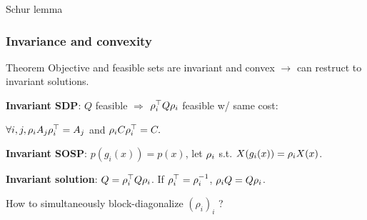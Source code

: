 \begin{frame}{Schur lemma}
\end{frame}

\begin{frame}[fragile]
  \frametitle{Invariance and convexity}
  \begin{block}{Theorem}
    Objective and feasible sets are \alert{invariant} and \alert{convex}
    $\to$
    can restruct to invariant solutions.
  \end{block}

    \textbf{Invariant SDP}:
    $Q$ feasible $\Rightarrow$ $\rho_i^\top Q \rho_i$ feasible w/ same cost:

    $\forall i, j, \rho_i A_j \rho_i^\top = A_j$ and $\rho_i C \rho_i^\top = C.$

    \textbf{Invariant SOSP}:
    $p(g_i(x)) = p(x)$, let $\rho_i$ s.t. $X(g_i(x)) = \rho_i X(x)$.

    \textbf{Invariant solution}:
    $Q = \rho_i^\top Q \rho_i$. If $\rho_i^\top = \rho_i^{-1}$, $\rho_i Q = Q \rho_i$.

  \begin{center}
    How to \alert{simultaneously} block-diagonalize $(\rho_i)_i$ ?
  \end{center}

\end{frame}
